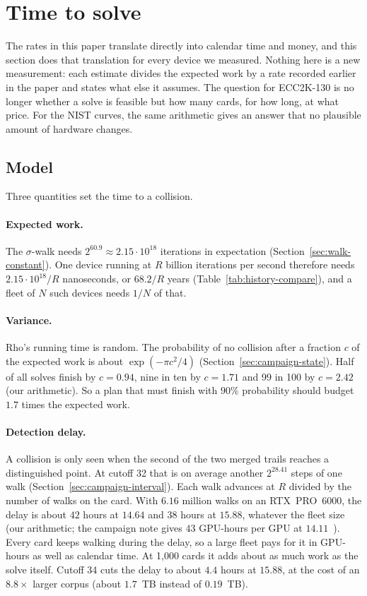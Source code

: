 \section{Time to solve}
\label{sec:solvetime}

The rates in this paper translate directly into calendar time and
money, and this section does that translation for every device we
measured. Nothing here is a new measurement: each estimate divides the
expected work by a rate recorded earlier in the paper and states what
else it assumes. The question for ECC2K-130 is no longer whether a solve
is feasible but how many cards, for how long, at what price. For the
NIST curves, the same arithmetic gives an answer that no plausible
amount of hardware changes.

\subsection{Model}
\label{sec:solvetime-model}

Three quantities set the time to a collision.

\paragraph{Expected work.} The $\sigma$-walk needs $2^{60.9}\approx2.15\cdot10^{18}$
iterations in expectation (Section~\ref{sec:walk-constant}). One
device running at $R$ billion iterations per second therefore needs
$2.15\cdot10^{18}/R$ nanoseconds, or $68.2/R$ years
(Table~\ref{tab:history-compare}), and a fleet of $N$ such devices
needs $1/N$ of that.

\paragraph{Variance.} Rho's running time is random. The probability
of no collision after a fraction $c$ of the expected work is about
$\exp(-\pi c^2/4)$ (Section~\ref{sec:campaign-state}). Half of all
solves finish by $c=0.94$, nine in ten by $c=1.71$ and 99 in 100 by
$c=2.42$ (our arithmetic). So a plan that must finish with $90\%$
probability should budget $1.7$ times the expected work.

\paragraph{Detection delay.} A collision is only seen when the
second of the two merged trails reaches a distinguished point. At
cutoff 32 that is on average another $2^{28.41}$ steps of one walk
(Section~\ref{sec:campaign-interval}). Each walk advances at $R$
divided by the number of walks on the card. With $6.16$ million walks
on an RTX~PRO~6000, the delay is about $42$ hours at $14.64$ and $38$
hours at $15.88$, whatever the fleet size (our arithmetic; the campaign
note gives $43$ GPU-hours per GPU at $14.11$~).
Every card keeps walking during the delay, so a large fleet pays for it
in GPU-hours as well as calendar time. At 1{,}000 cards it adds about
as much work as the solve itself. Cutoff 34 cuts the delay to about
$4.4$ hours at $15.88$, at the cost of an $8.8\times$ larger corpus
(about $1.7$~TB instead of $0.19$~TB).

